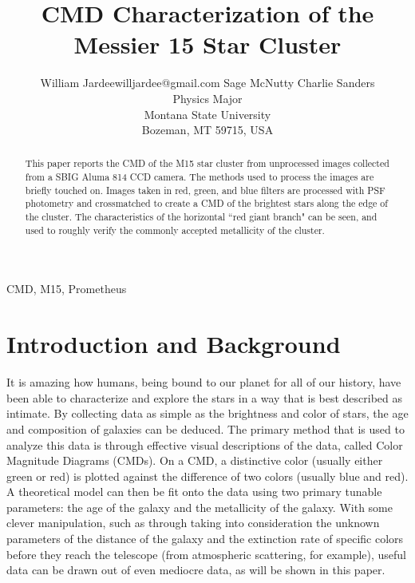 \documentclass[twoside,11pt]{article}
\begin{document}
\title{CMD Characterization of the Messier 15 Star Cluster}

       
\author{\name William Jardee\email willjardee@gmail.com \AND
       	\name Sage McNutty \email  \AND 
        \name Charlie Sanders \email  \\
       	\addr Physics Major\\
       	Montana State University\\
       	Bozeman, MT 59715, USA
      	}

\maketitle

\begin{abstract}%
This paper reports the CMD of the M15 star cluster from unprocessed images collected from a SBIG Aluma 814 CCD camera. The methods used to process the images are briefly touched on. Images taken in red, green, and blue filters are processed with PSF photometry and crossmatched to create a CMD of the brightest stars along the edge of the cluster. The characteristics of the horizontal ``red giant branch" can be seen, and used to roughly verify the commonly accepted metallicity of the cluster. 
\end{abstract}

\begin{keywords}
CMD, M15, Prometheus
\end{keywords}

\section{Introduction and Background}
It is amazing how humans, being bound to our planet for all of our history, have been able to characterize and explore the stars in a way that is best described as intimate. By collecting data as simple as the brightness and color of stars, the age and composition of galaxies can be deduced. The primary method that is used to analyze this data is through effective visual descriptions of the data, called Color Magnitude Diagrams (CMDs). On a CMD, a distinctive color (usually either green or red) is plotted against the difference of two colors (usually blue and red). A theoretical model can then be fit onto the data using two primary tunable parameters: the age of the galaxy and the metallicity of the galaxy. With some clever manipulation, such as through taking into consideration the unknown parameters of the distance of the galaxy and the extinction rate of specific colors before they reach the telescope (from atmospheric scattering, for example), useful data can be drawn out of even mediocre data, as will be shown in this paper. 
\end{document}
